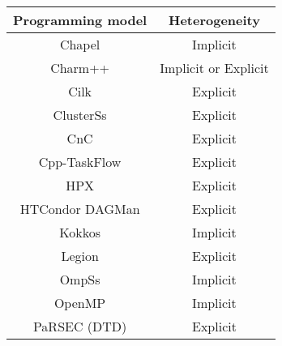 \begin{tabular}{cc}
\hline
Programming model & Heterogeneity \\
\hline
Chapel & Implicit\\
Charm++ & Implicit or Explicit\\
Cilk & Explicit\\
ClusterSs & Explicit\\
CnC & Explicit\\
Cpp-TaskFlow & Explicit\\
HPX & Explicit\\
HTCondor DAGMan & Explicit\\
Kokkos & Implicit\\
Legion & Explicit\\
OmpSs & Implicit\\
OpenMP & Implicit\\
PaRSEC (DTD) & Explicit\\
\hline
\end{tabular}
